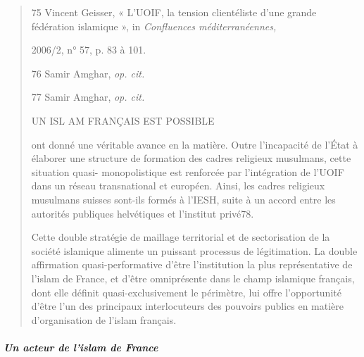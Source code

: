 \begin{quote}
75 Vincent Geisser, « L'UOIF, la tension clientéliste d'une grande
fédération islamique », in \emph{Confluences méditerranéennes,}

2006/2, n° 57, p. 83 à 101.

76 Samir Amghar, \emph{op. cit.}

77 Samir Amghar, \emph{op. cit.}

UN ISL AM FRANÇAIS EST POSSIBLE

ont donné une véritable avance en la matière. Outre l'incapacité de
l'État à élaborer une structure de formation des cadres religieux
musulmans, cette situation quasi- monopolistique est renforcée par
l'intégration de l'UOIF dans un réseau transnational et européen. Ainsi,
les cadres religieux musulmans suisses sont-ils formés à l'IESH, suite à
un accord entre les autorités publiques helvétiques et l'institut
privé78.

Cette double stratégie de maillage territorial et de sectorisation de la
société islamique alimente un puissant processus de légitimation. La
double affirmation quasi-performative d'être l'institution la plus
représentative de l'islam de France, et d'être omniprésente dans le
champ islamique français, dont elle définit quasi-exclusivement le
périmètre, lui offre l'opportunité d'être l'un des principaux
interlocuteurs des pouvoirs publics en matière d'organisation de l'islam
français.
\end{quote}

\hypertarget{un-acteur-de-lislam-de-france}{%
\subparagraph{Un acteur de l'islam de
France}\label{un-acteur-de-lislam-de-france}}

